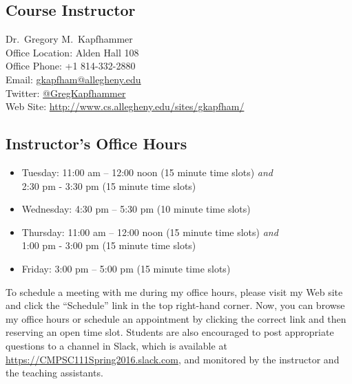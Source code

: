 

\usepackage[compact]{titlesec}



\vspace*{-.1in}
\subsection*{Course Instructor}
Dr.\ Gregory M.\ Kapfhammer\\
\noindent Office Location: Alden Hall 108 \\
\noindent Office Phone: +1 814-332-2880 \\
\noindent Email: \url{gkapfham@allegheny.edu} \\
\noindent Twitter: \url{@GregKapfhammer} \\
\noindent Web Site: \url{http://www.cs.allegheny.edu/sites/gkapfham/}

\subsection*{Instructor's Office Hours}

\begin{itemize}
  \itemsep 0em

  \item Tuesday: 11:00 am -- 12:00 noon (15 minute time slots) {\em and} \\ \hspace*{.6in}
    2:30 pm - 3:30 pm (15 minute time slots)

  \item Wednesday: 4:30 pm -- 5:30 pm (10 minute time slots)

  \item Thursday: 11:00 am -- 12:00 noon (15 minute time slots) {\em and} \\ \hspace*{.68in}
    1:00 pm - 3:00 pm (15 minute time slots)

  \item Friday: 3:00 pm -- 5:00 pm (15 minute time slots)

\end{itemize}

\vspace*{-.1in}

\noindent To schedule a meeting with me during my office hours, please visit my Web site and click the ``Schedule'' link
in the top right-hand corner. Now, you can browse my office hours or schedule an appointment by clicking the correct
link and then reserving an open time slot. Students are also encouraged to post appropriate questions to a channel in
Slack, which is available at \url{https://CMPSC111Spring2016.slack.com}, and monitored by the instructor and the teaching
assistants.

